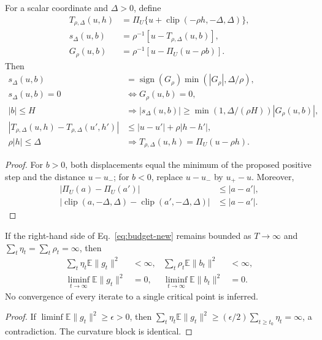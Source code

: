\begin{proposition}
For a scalar coordinate and $\Delta>0$, define
\begin{align}
 T_{\rho,\Delta}(u,h)&=\Pi_U\{u+\operatorname{clip}(-\rho h,-\Delta,\Delta)\},\\
 s_\Delta(u,b)&=\rho^{-1}[u-T_{\rho,\Delta}(u,b)],\\
 G_\rho(u,b)&=\rho^{-1}[u-\Pi_U(u-\rho b)].
\end{align}
Then
\begin{align}
 s_\Delta(u,b)&=\operatorname{sign}(G_\rho)\min(|G_\rho|,\Delta/\rho),\\
 s_\Delta(u,b)=0&\Longleftrightarrow G_\rho(u,b)=0,\\
 |b|\le H&\Longrightarrow
 |s_\Delta(u,b)|\ge\min(1,\Delta/(\rho H))|G_\rho(u,b)|,\\
 |T_{\rho,\Delta}(u,h)-T_{\rho,\Delta}(u',h')|
 &\le|u-u'|+\rho|h-h'|,\\
 \rho|h|\le\Delta&\Longrightarrow T_{\rho,\Delta}(u,h)=\Pi_U(u-\rho h).
\end{align}
\end{proposition}
\begin{proof}
For $b>0$, both displacements equal the minimum of the proposed positive step and the distance $u-u_-$; for $b<0$, replace $u-u_-$ by $u_+-u$. Moreover,
\begin{align}
 |\Pi_U(a)-\Pi_U(a')|&\le|a-a'|,\\
 |\operatorname{clip}(a,-\Delta,\Delta)-\operatorname{clip}(a',-\Delta,\Delta)|&\le|a-a'|.
\end{align}
\end{proof}

\begin{proposition}
If the right-hand side of Eq.~\eqref{eq:budget-new} remains bounded as $T\to\infty$ and
$\sum_t\eta_t=\sum_t\rho_t=\infty$, then
\begin{align}
 \sum_t\eta_t\mathbb E\|g_t\|^2&<\infty,&
 \sum_t\rho_t\mathbb E\|b_t\|^2&<\infty,\\
 \liminf_{t\to\infty}\mathbb E\|g_t\|^2&=0,&
 \liminf_{t\to\infty}\mathbb E\|b_t\|^2&=0.
\end{align}
No convergence of every iterate to a single critical point is inferred.
\end{proposition}
\begin{proof}
If $\liminf\mathbb E\|g_t\|^2\ge\epsilon>0$, then
$\sum_t\eta_t\mathbb E\|g_t\|^2\ge(\epsilon/2)\sum_{t\ge t_0}\eta_t=\infty$, a contradiction. The curvature block is identical.
\end{proof}

